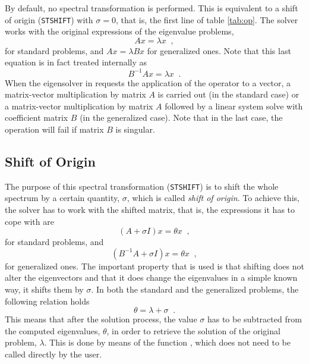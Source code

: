	By default, no spectral transformation is performed. This is equivalent to a shift of origin (\texttt{STSHIFT}) with $\sigma=0$, that is, the first line of table \ref{tab:op}. The solver works with the original expressions of the eigenvalue problems,
\begin{equation}Ax=\lambda x\;\;,\end{equation}
for standard problems, and $Ax=\lambda Bx$ for generalized ones. Note that this last equation is in fact treated internally as
\begin{equation}B^{-1}Ax=\lambda x\;\;.\end{equation}
When the eigensolver in  requests the application of the operator to a vector, a matrix-vector multiplication by matrix $A$ is carried out (in the standard case) or a matrix-vector multiplication by matrix $A$ followed by a linear system solve with coefficient matrix $B$ (in the generalized case). Note that in the last case, the operation will fail if matrix $B$ is singular.

\subsection{Shift of Origin}

	The purpose of this spectral transformation (\texttt{STSHIFT}) is to shift the whole spectrum by a certain quantity, $\sigma$, which is called \emph{shift of origin}. To achieve this, the solver has to work with the shifted matrix, that is, the expressions it has to cope with are
\begin{equation}(A+\sigma I)x=\theta x\;\;,\end{equation}
for standard problems, and 
\begin{equation}(B^{-1}A+\sigma I) x=\theta x\;\;,\end{equation}
for generalized ones. The important property that is used is that shifting does not alter the eigenvectors and that it does change the eigenvalues in a simple known way, it shifts them by $\sigma$. In both the standard and the generalized problems, the following relation holds 
\begin{equation}\theta=\lambda+\sigma\;\;.\end{equation}
This means that after the solution process, the value $\sigma$ has to be subtracted from the computed eigenvalues, $\theta$, in order to retrieve the solution of the original problem, $\lambda$. This is done by means of the function , which does not need to be called directly by the user.

